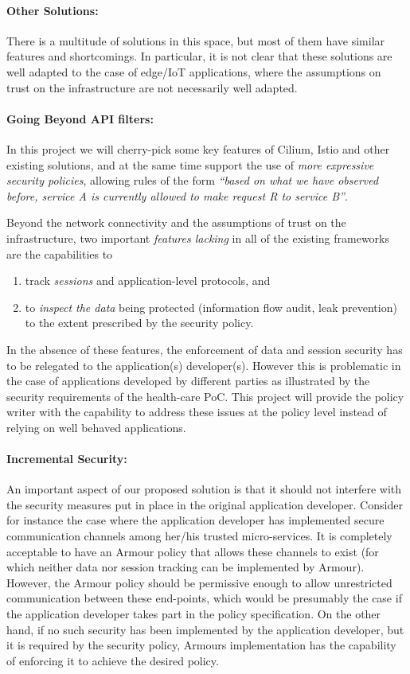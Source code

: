 \documentclass[a4paper%
]{article}
\newcommand{\armour}{{\sc Armour}}
\begin{document}
\paragraph{\sc Other Solutions:}
There is a multitude of solutions in this space, but most of them have
similar features and shortcomings.
%
In particular, it is not clear that these solutions are well adapted
to the case of edge/IoT applications, where the assumptions on trust
on the infrastructure are not necessarily well adapted. 

\paragraph{\sc Going Beyond API filters:}
In this project we will cherry-pick some key features of Cilium, Istio
and other existing solutions, and at the same time support the use of
\emph{more expressive security policies}, allowing rules of the form
\emph{“based on what we have observed before, service A is currently
  allowed to make request R to service B”}.

Beyond the network connectivity and the assumptions of trust on the
infrastructure, two important \emph{features lacking} in all of the
existing frameworks are the capabilities to
\begin{enumerate}
\item track \emph{sessions} and application-level protocols, and
\item to \emph{inspect the data} being protected (information flow audit,
  leak prevention) to the extent prescribed by the security policy.
\end{enumerate}
In the absence of these features, the enforcement of data and
session security has to be relegated to the application(s) developer(s).
%
However this is problematic in the case of applications developed by
different parties as illustrated by the security requirements of the
health-care PoC.
%
This project will provide the policy writer with the capability to
address these issues at the policy level instead of relying on well
behaved applications.

\paragraph{\sc Incremental Security:}
An important aspect of our proposed solution is that it should not
interfere with the security measures put in place in the original
application developer.
%
Consider for instance the case where the application developer has
implemented secure communication channels among her/his trusted
micro-services.
%
It is completely acceptable to have an \armour{} policy that allows
these channels to exist (for which neither data nor session tracking
can be implemented by \armour{}).
%
However, the \armour{} policy should be permissive enough to allow
unrestricted communication between these end-points, which would be
presumably the case if the application developer takes part in the
policy specification. 
%
On the other hand, if no such security has been implemented by the
application developer, but it is required by the security policy,
\armour{}s implementation has the capability of enforcing it to
achieve the desired policy.
\end{document}
